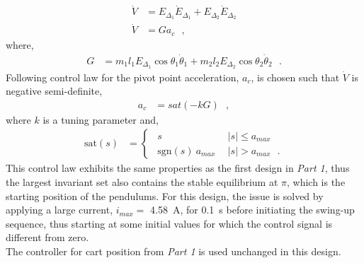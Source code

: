 \begin{align}
  \dot{V} &= E_{\Delta_1} \dot{E}_{\Delta_1} + E_{\Delta_2} \dot{E}_{\Delta_2}  \label{eq:lyapunovDerivativeTwin1} \\ 
  \dot{V} &= G a_c   \ \ \ ,  \label{eq:lyapunovDerivativeTwin2}
\end{align}
%
where,
\begin{align}
  G &= m_1 l_1 E_{\Delta_1} \cos \theta_1 \dot{\theta}_1 +  m_2 l_2 E_{\Delta_2} \cos \theta_2 \dot{\theta}_2  \ \ \ .  \label{eq:lyapunovDerivativeTwinG}
\end{align}
Following control law for the pivot point acceleration, $a_c$, is chosen such that $\dot{V}$ is negative semi-definite,
\begin{align}
  a_c &= sat( -k G ) \ \ \ ,  \label{eq:twinSwingControl1}
\end{align}
where $k$ is a tuning parameter and,
\begin{align}
  \text{sat}(s) &=
  \begin{cases}
    \ \ s                           & \ \  | s |  \leq a_{max} \\
    \ \ \mathrm{sgn}( s )\ a_{max}  & \ \  | s |  >  a_{max} \ \ \ .
  \end{cases}
  \label{eq:satuationFunctionTwin}
\end{align}
%
This control law exhibits the same properties as the first design in \textit{Part 1}, thus the largest invariant set also contains the stable equilibrium at $\pi$, which is the starting position of the pendulums. For this design, the issue is solved by applying a large current, $i_{max}=$ \SI{4.58}{A}, for \SI{0.1}{s} before initiating the swing-up sequence, thus starting at some initial values for which the control signal is different from zero.\\
The controller for cart position from \textit{Part 1} is used unchanged in this design.
%
